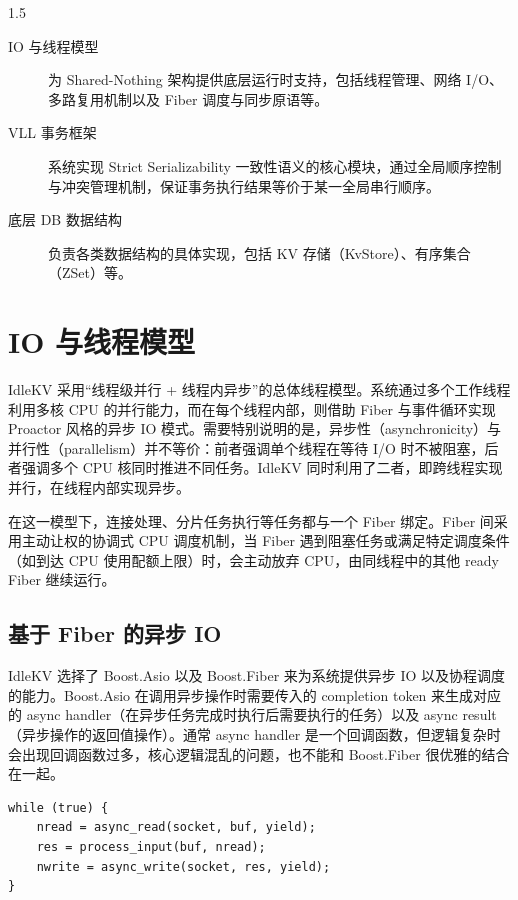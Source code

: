 \documentclass[a4paper,12pt,fontset=none,twoside]{article}
\numberwithin{figure}{section}
\numberwithin{equation}{section}
\numberwithin{table}{section}
\begin{document}
\begin{spacing}{1.5}
	\begin{description}
    \item[IO 与线程模型] 为 Shared-Nothing 架构提供底层运行时支持，包括线程管理、网络 I/O、多路复用机制以及 Fiber 调度与同步原语等。
    \item[VLL 事务框架] 系统实现 Strict Serializability 一致性语义的核心模块，通过全局顺序控制与冲突管理机制，保证事务执行结果等价于某一全局串行顺序。
    \item[底层 DB 数据结构] 负责各类数据结构的具体实现，包括 KV 存储（KvStore）、有序集合（ZSet）等。
	\end{description}
	\section{IO 与线程模型}\label{sec:io-thread-model}

	IdleKV 采用“线程级并行 + 线程内异步”的总体线程模型。系统通过多个工作线程利用多核 CPU 的并行能力，而在每个线程内部，则借助 Fiber 与事件循环实现 Proactor 风格的异步 IO 模式。需要特别说明的是，异步性（asynchronicity）与并行性（parallelism）并不等价：前者强调单个线程在等待 I/O 时不被阻塞，后者强调多个 CPU 核同时推进不同任务。IdleKV 同时利用了二者，即跨线程实现并行，在线程内部实现异步。

	在这一模型下，连接处理、分片任务执行等任务都与一个 Fiber 绑定。Fiber 间采用主动让权的协调式 CPU 调度机制，当 Fiber 遇到阻塞任务或满足特定调度条件（如到达 CPU 使用配额上限）时，会主动放弃 CPU，由同线程中的其他 ready Fiber 继续运行。

	\subsection{基于 Fiber 的异步 IO}
	
	IdleKV 选择了 Boost.Asio 以及 Boost.Fiber\cite{Boost-Asio,Boost-Fiber} 来为系统提供异步 IO 以及协程调度的能力。Boost.Asio 在调用异步操作时需要传入的 completion token 来生成对应的 async handler（在异步任务完成时执行后需要执行的任务）以及 async result（异步操作的返回值操作）。通常 async handler 是一个回调函数，但逻辑复杂时会出现回调函数过多，核心逻辑混乱的问题，也不能和 Boost.Fiber 很优雅的结合在一起。

\begin{listing}[htbp]
\centering
\begin{minipage}{0.72\textwidth}
\begin{lstlisting}[style=idlecpp]
while (true) {
    nread = async_read(socket, buf, yield);
    res = process_input(buf, nread);
    nwrite = async_write(socket, res, yield);
}
\end{lstlisting}
\end{minipage}
\caption{使用 \texttt{yield\_t} 的同步风格 I/O 示例}
\label{lst:yield-sync-io}
\end{listing}


\end{spacing}
\end{document}

